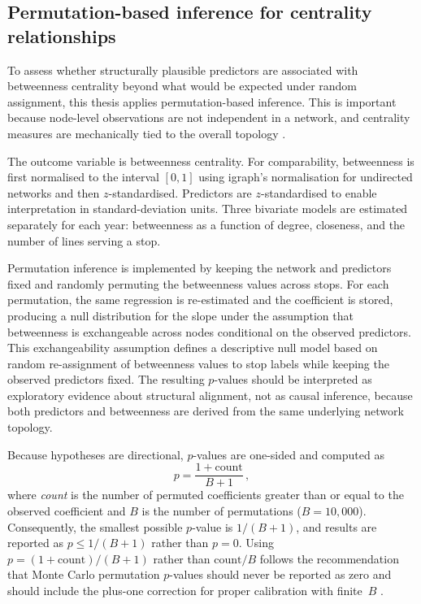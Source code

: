 \documentclass[12pt,a4paper,oneside]{report}
\begin{document}
\subsection{Permutation-based inference for centrality relationships}\label{sec:permutation-method}

To assess whether structurally plausible predictors are associated with betweenness centrality beyond what would be expected under random assignment, this thesis applies permutation-based inference.
This is important because node-level observations are not independent in a network, and centrality measures are mechanically tied to the overall topology \citep{butts2008}.

The outcome variable is betweenness centrality.
For comparability, betweenness is first normalised to the interval $[0,1]$ using igraph's normalisation for undirected networks and then $z$-standardised.
Predictors are $z$-standardised to enable interpretation in standard-deviation units.
Three bivariate models are estimated separately for each year: betweenness as a function of degree, closeness, and the number of lines serving a stop.

Permutation inference is implemented by keeping the network and predictors fixed and randomly permuting the betweenness values across stops.
For each permutation, the same regression is re-estimated and the coefficient is stored, producing a null distribution for the slope under the assumption that betweenness is exchangeable across nodes conditional on the observed predictors.
This exchangeability assumption defines a descriptive null model based on random re-assignment of betweenness values to stop labels while keeping the observed predictors fixed.
The resulting $p$-values should be interpreted as exploratory evidence about structural alignment, not as causal inference, because both predictors and betweenness are derived from the same underlying network topology.

Because hypotheses are directional, $p$-values are one-sided and computed as
\begin{equation}\label{eq:pvalue}
  p = \frac{1 + \text{count}}{B + 1}\,,
\end{equation}
where \emph{count} is the number of permuted coefficients greater than or equal to the observed coefficient and $B$ is the number of permutations ($B = 10{,}000$).
Consequently, the smallest possible $p$-value is $1/(B+1)$, and results are reported as $p \leq 1/(B+1)$ rather than $p = 0$.
Using $p = (1 + \text{count})/(B + 1)$ rather than $\text{count}/B$ follows the recommendation that Monte Carlo permutation $p$-values should never be reported as zero and should include the plus-one correction for proper calibration with finite~$B$ \citep{phipson2010}.
\end{document}
